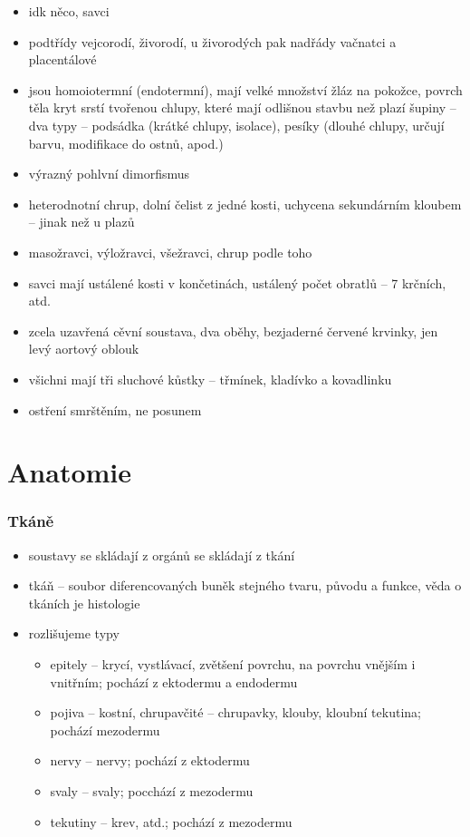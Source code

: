 \documentclass{article}
\begin{document}
\begin{itemize}
  \item idk něco, savci
  \item podtřídy vejcorodí, živorodí, u živorodých pak nadřády vačnatci a placentálové
  \item jsou homoiotermní (endotermní), mají velké množství žláz na pokožce, povrch těla kryt srstí tvořenou chlupy, které mají odlišnou stavbu než plazí šupiny -- dva typy -- podsádka (krátké chlupy, isolace), pesíky (dlouhé chlupy, určují barvu, modifikace do ostnů, apod.)
  \item výrazný pohlvní dimorfismus
  \item heterodnotní chrup, dolní čelist z jedné kosti, uchycena sekundárním kloubem -- jinak než u plazů
  \item masožravci, výložravci, všežravci, chrup podle toho
  \item savci mají ustálené kosti v končetinách, ustálený počet obratlů -- 7 krčních, atd.
  \item zcela uzavřená cěvní soustava, dva oběhy, bezjaderné červené krvinky, jen levý aortový oblouk
  \item všichni mají tři sluchové kůstky -- třmínek, kladívko a kovadlinku
  \item ostření smrštěním, ne posunem
\end{itemize}

\part{Anatomie}

\section{Tkáně}
\begin{itemize}
  \item soustavy se skládají z orgánů se skládají z tkání
  \item tkáň -- soubor diferencovaných buněk stejného tvaru, původu a funkce, věda o tkáních je histologie
  \item rozlišujeme typy
  \begin{itemize}
    \item epitely -- krycí, vystlávací, zvětšení povrchu, na povrchu vnějším i vnitřním; pochází z ektodermu a endodermu
    \item pojiva -- kostní, chrupavčité -- chrupavky, klouby, kloubní tekutina; pochází mezodermu
    \item nervy -- nervy; pochází z ektodermu
    \item svaly -- svaly; pocchází z mezodermu
    \item tekutiny -- krev, atd.; pochází z mezodermu
  \end{itemize}
\end{itemize}
\end{document}
